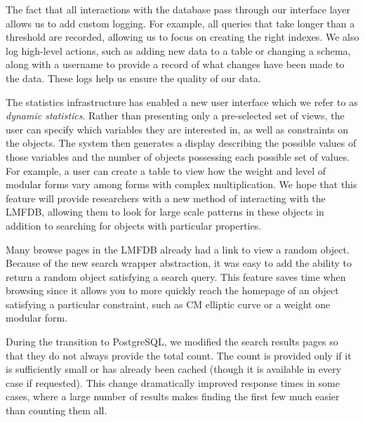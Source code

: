 \documentclass{amsart}
\begin{document}
The fact that all interactions with the database pass through our interface layer allows us to add custom logging.
For example, all queries that take longer than a threshold are recorded, allowing us to focus on creating the right indexes.
We also log high-level actions, such as adding new data to a table or changing a schema, along with a username to provide a record of what changes have been made to the data.
These logs help us ensure the quality of our data.

The statistics infrastructure has enabled a new user interface which we refer to as \emph{dynamic statistics}.
Rather than presenting only a pre-selected set of views, the user can specify which variables they are interested in, as well as constraints on the objects.
The system then generates a display describing the possible values of those variables and the number of objects possessing each possible set of values.
For example, a user can create a table to view how the weight and level of modular forms vary among forms with complex multiplication.
We hope that this feature will provide researchers with a new method of interacting with the LMFDB, allowing them to look for large scale patterns in these objects in addition to searching for objects with particular properties.

Many browse pages in the LMFDB already had a link to view a random object.
Because of the new search wrapper abstraction, it was easy to add the ability to return a random object satisfying a search query.
This feature saves time when browsing since it allows you to more quickly reach the homepage of an object satisfying a particular constraint, such as CM elliptic curve or a weight one modular form.

During the transition to PostgreSQL, we modified the search results pages so that they do not always provide the total count.
The count is provided only if it is sufficiently small or has already been cached (though it is available in every case if requested).
This change dramatically improved response times in some cases, where a large number of results makes finding the first few much easier than counting them all.
\end{document}
